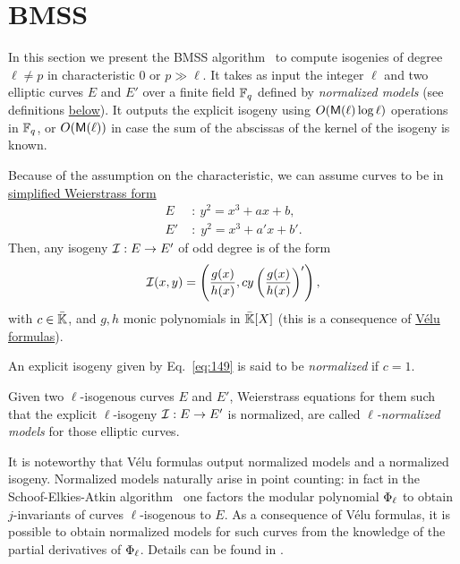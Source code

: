 \section{BMSS}
\label{sec:bmss}
In this section we present the BMSS
algorithm~\cite{bostan+morain+salvy+schost08} to compute isogenies of
degree $\ell\ne p$ in characteristic $0$ or $p\gg\ell$. It takes as
input the integer $\ell$ and two elliptic curves $E$ and $E'$ over a
finite field $\mathbb{F}_q$ defined by \emph{normalized models} (see
definitions \hyperref[def:canon-isog]{below}). It outputs the explicit
isogeny using $O(\mathsf{M}(\ell)\log\ell)$ operations in $\mathbb{F}_q$, or
$O(\mathsf{M}(\ell))$ in case the sum of the abscissas of the kernel of the
isogeny is known.

Because of the assumption on the characteristic, we can assume curves
to be in \hyperref[th:simplified-weierstrass]{simplified Weierstrass
  form}
\begin{equation}
  \label{eq:140}
  \begin{aligned}
    E \;&:\: y^2 = x^3 + ax + b\text{,}\\
    E'\;&:\; y^2 = x^3 + a'x + b'\text{.}
  \end{aligned}
\end{equation}
Then, any isogeny $\mathcal{I}:E\rightarrow E'$ of odd degree is of the form
\begin{equation}
  \label{eq:149}
  \mathcal{I}(x,y) = \left(\frac{g(x)}{h(x)},cy\left(\frac{g(x)}{h(x)}\right)'\right)
  \text{,}
\end{equation}
with $c\in\bar{\mathbb{K}}$, and $g,h$ monic polynomials in $\bar{\mathbb{K}}[X]$
(this is a consequence of \hyperref[eq:159]{Vélu formulas}).

\begin{definition}
  \label{def:canon-isog}
  An explicit isogeny given by Eq.~\eqref{eq:149} is said to be
  \emph{normalized}
  if $c=1$. 

  Given two $\ell$-isogenous curves $E$ and $E'$, Weierstrass
  equations for them such that the explicit $\ell$-isogeny
  $\mathcal{I}:E\rightarrow E'$ is normalized, are called
  \emph{$\ell$-normalized models} for those
  elliptic curves.
\end{definition}

 It is noteworthy that Vélu formulas output normalized
models and a normalized isogeny. Normalized models naturally arise in
point counting: in fact in the Schoof-Elkies-Atkin
algorithm~\cite{atkin88,elkies98,schoof95} one factors the modular
polynomial $\Phi_\ell$ to obtain $j$-invariants of curves
$\ell$-isogenous to $E$. As a consequence of Vélu formulas, it is
possible to obtain normalized models for such curves from the
knowledge of the partial derivatives of $\Phi_\ell$.  Details can
be found in \cite{schoof95,morain95,elkies98,lercier-algorithmique}.

